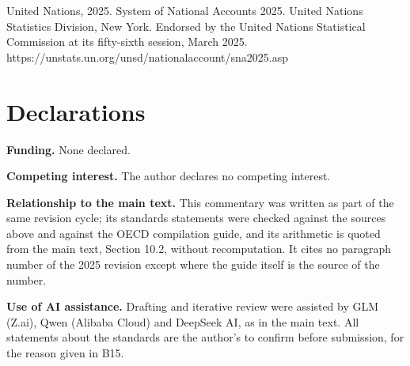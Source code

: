 \documentclass[11pt]{article}
\begin{document}
United Nations, 2025. System of National Accounts 2025. United Nations Statistics Division, New York. Endorsed by the United Nations Statistical Commission at its fifty-sixth session, March 2025. https://unstats.un.org/unsd/nationalaccount/sna2025.asp

\vspace{0.8em}

\section*{Declarations}\label{declarations}

\textbf{Funding.} None declared.

\textbf{Competing interest.} The author declares no competing interest.

\textbf{Relationship to the main text.} This commentary was written as part of the same revision cycle; its standards statements were checked against the sources above and against the OECD compilation guide, and its arithmetic is quoted from the main text, Section 10.2, without recomputation. It cites no paragraph number of the 2025 revision except where the guide itself is the source of the number.

\textbf{Use of AI assistance.} Drafting and iterative review were assisted by GLM (Z.ai), Qwen (Alibaba Cloud) and DeepSeek AI, as in the main text. All statements about the standards are the author's to confirm before submission, for the reason given in B15.
\end{document}
